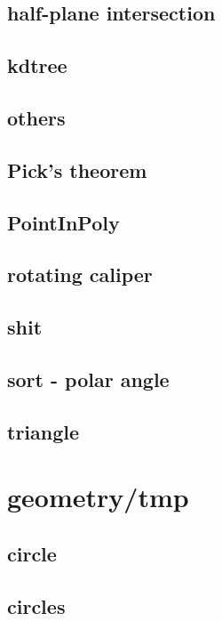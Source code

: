 \documentclass[a4paper,5pt,twocolumn,titlepage]{article}
\begin{document}
\subsection{half-plane intersection}

\subsection{kdtree}

\subsection{others}

\subsection{Pick's theorem}

\subsection{PointInPoly}

\subsection{rotating caliper}

\subsection{shit}

\subsection{sort - polar angle}

\subsection{triangle}

\section{geometry/tmp}
\subsection{circle}

\subsection{circles}

\end{document}
